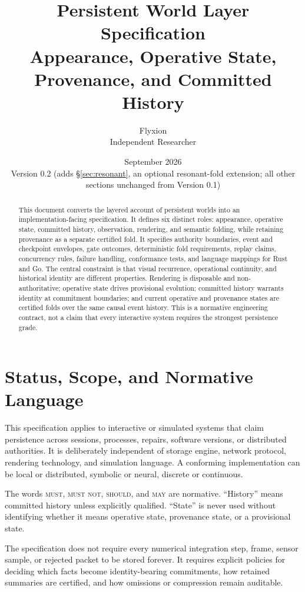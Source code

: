 \documentclass[11pt]{article}
\title{\textbf{Persistent World Layer Specification}\\[4pt]
\large Appearance, Operative State, Provenance, and Committed History}
\author{Flyxion\\\small Independent Researcher}
\date{September 2026\\Version 0.2 (adds \S\ref{sec:resonant}, an optional resonant-fold extension; all other sections unchanged from Version 0.1)}
\newcommand{\MUST}{\textsc{must}}
\newcommand{\MUSTNOT}{\textsc{must not}}
\newcommand{\SHOULD}{\textsc{should}}
\newcommand{\MAY}{\textsc{may}}
\begin{document}
\maketitle

\begin{abstract}
This document converts the layered account of persistent worlds into an implementation-facing specification. It defines six distinct roles: appearance, operative state, committed history, observation, rendering, and semantic folding, while retaining provenance as a separate certified fold. It specifies authority boundaries, event and checkpoint envelopes, gate outcomes, deterministic fold requirements, replay claims, concurrency rules, failure handling, conformance tests, and language mappings for Rust and Go. The central constraint is that visual recurrence, operational continuity, and historical identity are different properties. Rendering is disposable and non-authoritative; operative state drives provisional evolution; committed history warrants identity at commitment boundaries; and current operative and provenance states are certified folds over the same causal event history. This is a normative engineering contract, not a claim that every interactive system requires the strongest persistence grade.
\end{abstract}

\tableofcontents

\section{Status, Scope, and Normative Language}

This specification applies to interactive or simulated systems that claim persistence across sessions, processes, repairs, software versions, or distributed authorities. It is deliberately independent of storage engine, network protocol, rendering technology, and simulation language. A conforming implementation can be local or distributed, symbolic or neural, discrete or continuous.

The words \MUST, \MUSTNOT, \SHOULD, and \MAY{} are normative. ``History'' means committed history unless explicitly qualified. ``State'' is never used without identifying whether it means operative state, provenance state, or a provisional state.

The specification does not require every numerical integration step, frame, sensor sample, or rejected packet to be stored forever. It requires explicit policies for deciding which facts become identity-bearing commitments, how retained summaries are certified, and how omissions or compression remain auditable.
\end{document}
